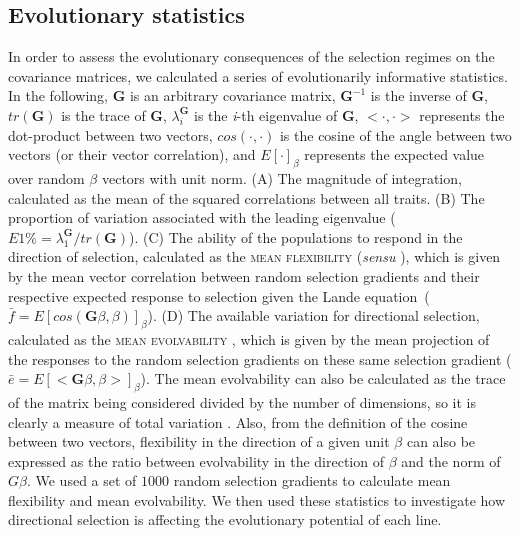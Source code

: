 \begin{refsection}
\subsection{Evolutionary statistics}

In order to assess the evolutionary consequences of the selection
regimes on the covariance matrices, we calculated a series of
evolutionarily informative statistics. In the following, \(\mathbf{G}\)
is an arbitrary covariance matrix, \(\mathbf{G}^{-1}\) is the inverse of
\(\mathbf{G}\), \(tr(\mathbf{G})\) is the trace of \(\mathbf{G}\),
\(\lambda_i^\mathbf{G}\) is the \emph{i}-th eigenvalue of
\(\mathbf{G}\), \(<\cdot, \cdot>\) represents the dot-product between
two vectors, \(cos(\cdot, \cdot)\) is the cosine of the angle between
two vectors (or their vector correlation), and \(E[\cdot]_\beta\)
represents the expected value over random \(\beta\) vectors with unit
norm. (A) The magnitude of integration, calculated as the mean of the
squared correlations between all traits. (B) The proportion of variation
associated with the leading eigenvalue
(\(E1\% = \lambda_1^{\mathbf{G}} / tr(\mathbf{G})\)). (C) The ability of
the populations to respond in the direction of selection, calculated as
the \textsc{mean flexibility} (\emph{sensu} \textcite{Marroig2009-gf}), which is
given by the mean vector correlation between random selection gradients
and their respective expected response to selection given the Lande
equation~(\(\bar{f} = E[cos(\mathbf{G}\beta,\beta)]_\beta\)). (D) The
available variation for directional selection, calculated as the
\textsc{mean evolvability} \parencite{Hansen2008-kz}, which is given by the mean
projection of the responses to the random selection gradients on these
same selection gradient
(\(\bar{e} = E[<\mathbf{G}\beta,\beta>]_\beta\)). The mean evolvability
can also be calculated as the trace of the matrix being considered
divided by the number of dimensions, so it is clearly a measure of total
variation \parencite{Hansen2008-kz}. Also, from the definition of the cosine
between two vectors, flexibility in the direction of a given unit
\(\beta\) can also be expressed as the ratio between evolvability in the
direction of \(\beta\) and the norm of \(G\beta\). We used a set of
\(1000\) random selection gradients to calculate mean flexibility and
mean evolvability. We then used these statistics to investigate how
directional selection is affecting the evolutionary potential of each
line.


\end{refsection}
